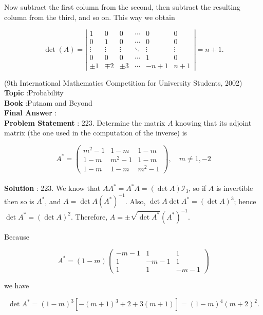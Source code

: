 \documentclass[10pt]{article}
\begin{document}
Now subtract the first column from the second, then subtract the resulting column from the third, and so on. This way we obtain 

$$
\operatorname{det}(A)=\left|\begin{array}{cccccc}
1 & 0 & 0 & \cdots & 0 & 0 \\
0 & 1 & 0 & \cdots & 0 & 0 \\
\vdots & \vdots & \vdots & \ddots & \vdots & \vdots \\
0 & 0 & 0 & \cdots & 1 & 0 \\
\pm 1 & \mp 2 & \pm 3 & \cdots & -n+1 & n+1
\end{array}\right|=n+1 .
$$

(9th International Mathematics Competition for University Students, 2002)
\\
\textbf{Topic} :Probability\\
\textbf{Book} :Putnam and Beyond\\
\textbf{Final Answer} :\\


\textbf{Problem Statement} :
223. Determine the matrix $A$ knowing that its adjoint matrix (the one used in the computation of the inverse) is

$$
A^{*}=\left(\begin{array}{ccc}
m^{2}-1 & 1-m & 1-m \\
1-m & m^{2}-1 & 1-m \\
1-m & 1-m & m^{2}-1
\end{array}\right), \quad m \neq 1,-2
$$
\\
\textbf{Solution} :
223. We know that $A A^{*}=A^{*} A=(\operatorname{det} A) \mathcal{I}_{3}$, so if $A$ is invertible then so is $A^{*}$, and $A=\operatorname{det} A\left(A^{*}\right)^{-1}$. Also, $\operatorname{det} A \operatorname{det} A^{*}=(\operatorname{det} A)^{3}$; hence $\operatorname{det} A^{*}=(\operatorname{det} A)^{2}$. Therefore, $A=\pm \sqrt{\operatorname{det} A^{*}}\left(A^{*}\right)^{-1}$.

Because

$$
A^{*}=(1-m)\left(\begin{array}{ccc}
-m-1 & 1 & 1 \\
1 & -m-1 & 1 \\
1 & 1 & -m-1
\end{array}\right)
$$

we have

$$
\operatorname{det} A^{*}=(1-m)^{3}\left[-(m+1)^{3}+2+3(m+1)\right]=(1-m)^{4}(m+2)^{2} .
$$
\end{document}
